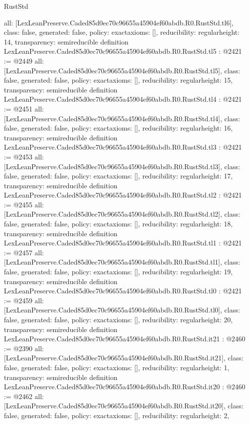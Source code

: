 \begin{lexlean}{RustStd}
\begin{coremodule}
{  all: [LexLeanPreserve.Caded85d0ec70c96655a45904ef60abdb.R0.RustStd.tl6],
  class: false,
  generated: false,
  policy: exact{axioms: []},
  reducibility: regular{height: 14},
  transparency: semireducible
}
definition LexLeanPreserve.Caded85d0ec70c96655a45904ef60abdb.R0.RustStd.tl5 : @2421 := @2449 {
  all: [LexLeanPreserve.Caded85d0ec70c96655a45904ef60abdb.R0.RustStd.tl5],
  class: false,
  generated: false,
  policy: exact{axioms: []},
  reducibility: regular{height: 15},
  transparency: semireducible
}
definition LexLeanPreserve.Caded85d0ec70c96655a45904ef60abdb.R0.RustStd.tl4 : @2421 := @2451 {
  all: [LexLeanPreserve.Caded85d0ec70c96655a45904ef60abdb.R0.RustStd.tl4],
  class: false,
  generated: false,
  policy: exact{axioms: []},
  reducibility: regular{height: 16},
  transparency: semireducible
}
definition LexLeanPreserve.Caded85d0ec70c96655a45904ef60abdb.R0.RustStd.tl3 : @2421 := @2453 {
  all: [LexLeanPreserve.Caded85d0ec70c96655a45904ef60abdb.R0.RustStd.tl3],
  class: false,
  generated: false,
  policy: exact{axioms: []},
  reducibility: regular{height: 17},
  transparency: semireducible
}
definition LexLeanPreserve.Caded85d0ec70c96655a45904ef60abdb.R0.RustStd.tl2 : @2421 := @2455 {
  all: [LexLeanPreserve.Caded85d0ec70c96655a45904ef60abdb.R0.RustStd.tl2],
  class: false,
  generated: false,
  policy: exact{axioms: []},
  reducibility: regular{height: 18},
  transparency: semireducible
}
definition LexLeanPreserve.Caded85d0ec70c96655a45904ef60abdb.R0.RustStd.tl1 : @2421 := @2457 {
  all: [LexLeanPreserve.Caded85d0ec70c96655a45904ef60abdb.R0.RustStd.tl1],
  class: false,
  generated: false,
  policy: exact{axioms: []},
  reducibility: regular{height: 19},
  transparency: semireducible
}
definition LexLeanPreserve.Caded85d0ec70c96655a45904ef60abdb.R0.RustStd.tl0 : @2421 := @2459 {
  all: [LexLeanPreserve.Caded85d0ec70c96655a45904ef60abdb.R0.RustStd.tl0],
  class: false,
  generated: false,
  policy: exact{axioms: []},
  reducibility: regular{height: 20},
  transparency: semireducible
}
definition LexLeanPreserve.Caded85d0ec70c96655a45904ef60abdb.R0.RustStd.it21 : @2460 := @2390 {
  all: [LexLeanPreserve.Caded85d0ec70c96655a45904ef60abdb.R0.RustStd.it21],
  class: false,
  generated: false,
  policy: exact{axioms: []},
  reducibility: regular{height: 1},
  transparency: semireducible
}
definition LexLeanPreserve.Caded85d0ec70c96655a45904ef60abdb.R0.RustStd.it20 : @2460 := @2462 {
  all: [LexLeanPreserve.Caded85d0ec70c96655a45904ef60abdb.R0.RustStd.it20],
  class: false,
  generated: false,
  policy: exact{axioms: []},
  reducibility: regular{height: 2},
}
\end{coremodule}
\end{lexlean}
